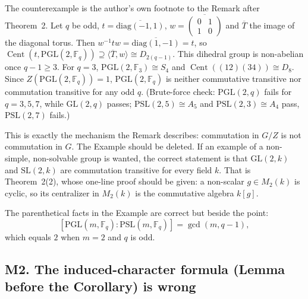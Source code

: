 \documentclass[12pt,letterpaper]{article}
\newcommand{\F}{\mathbb{F}}
\newcommand{\Cent}{\operatorname{Cent}}
\newcommand{\PGL}{\mathrm{PGL}}
\newcommand{\PSL}{\mathrm{PSL}}
\newcommand{\GL}{\mathrm{GL}}
\newcommand{\SL}{\mathrm{SL}}
\theoremstyle{definition}
\begin{document}
The counterexample is the author's own footnote to the Remark after
Theorem~2. Let $q$ be odd, $t=\overline{\mathrm{diag}(-1,1)}$,
$w=\overline{\left(\begin{smallmatrix}0&1\\1&0\end{smallmatrix}\right)}$
and $\overline{T}$ the image of the diagonal torus. Then
$w^{-1}tw=\overline{\mathrm{diag}(1,-1)}=t$, so
$\Cent(t,\PGL(2,\F_q))\supseteq\langle\overline T,w\rangle\cong
D_{2(q-1)}$. This dihedral group is non-abelian once $q-1\ge3$. For
$q=3$, $\PGL(2,\F_3)\cong S_4$ and $\Cent((12)(34))\cong D_8$. Since
$Z(\PGL(2,\F_q))=1$, $\PGL(2,\F_q)$ is neither commutative transitive
nor commutation transitive for any odd $q$. (Brute-force check:
$\PGL(2,q)$ fails for $q=3,5,7$, while $\GL(2,q)$ passes; $\PSL(2,5)\cong
A_5$ and $\PSL(2,3)\cong A_4$ pass, $\PSL(2,7)$ fails.)

This is exactly the mechanism the Remark describes: commutation in
$G/Z$ is not commutation in $G$. The Example should be deleted. If an
example of a non-simple, non-solvable group is wanted, the correct
statement is that $\GL(2,k)$ and $\SL(2,k)$ are commutation transitive
for every field $k$. That is Theorem~2(2), whose one-line proof should
be given: a non-scalar $g\in M_2(k)$ is cyclic, so its centralizer in
$M_2(k)$ is the commutative algebra $k[g]$.

The parenthetical facts in the Example are correct but beside the
point:
\[
[\PGL(m,\F_q):\PSL(m,\F_q)]=\gcd(m,q-1),
\]
which equals $2$ when $m=2$ and $q$ is odd.

\subsection*{M2. The induced-character formula (Lemma before the Corollary) is wrong}
\end{document}
